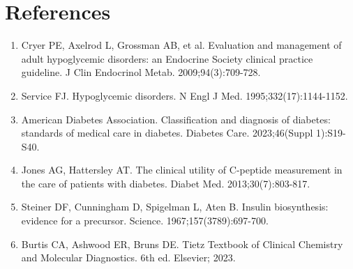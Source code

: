 \section*{References}
\begin{enumerate}
  \item Cryer PE, Axelrod L, Grossman AB, et al. Evaluation and management of adult hypoglycemic disorders: an Endocrine Society clinical practice guideline. J Clin Endocrinol Metab. 2009;94(3):709-728.
  \item Service FJ. Hypoglycemic disorders. N Engl J Med. 1995;332(17):1144-1152.
  \item American Diabetes Association. Classification and diagnosis of diabetes: standards of medical care in diabetes. Diabetes Care. 2023;46(Suppl 1):S19-S40.
  \item Jones AG, Hattersley AT. The clinical utility of C-peptide measurement in the care of patients with diabetes. Diabet Med. 2013;30(7):803-817.
  \item Steiner DF, Cunningham D, Spigelman L, Aten B. Insulin biosynthesis: evidence for a precursor. Science. 1967;157(3789):697-700.
  \item Burtis CA, Ashwood ER, Bruns DE. Tietz Textbook of Clinical Chemistry and Molecular Diagnostics. 6th ed. Elsevier; 2023.
\end{enumerate}

\clearpage
